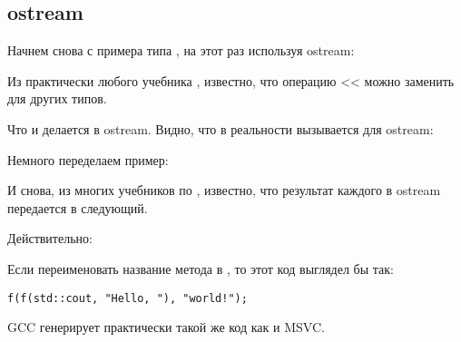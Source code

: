 \subsection{ostream}

Начнем снова с примера типа , на этот раз используя ostream:



Из практически любого учебника \Cpp, известно, что операцию << можно заменить для других типов.

Что и делается в ostream.
Видно, что в реальности вызывается  для ostream:



Немного переделаем пример:



И снова, из многих учебников по \Cpp, известно, что результат каждого  
в ostream передается в следующий.

Действительно:



Если переименовать название метода  в \ttf{}, то этот код выглядел бы так:

\begin{lstlisting}
f(f(std::cout, "Hello, "), "world!");
\end{lstlisting}

GCC генерирует практически такой же код как и MSVC.


